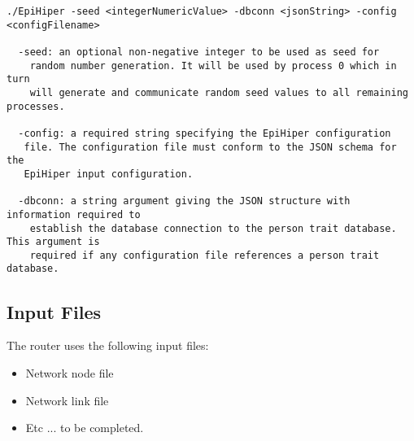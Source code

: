 \documentclass[english]{article}
\theoremstyle{remark}
\numberwithin{equation}{section}
\begin{document}
\begin{verbatim}
./EpiHiper -seed <integerNumericValue> -dbconn <jsonString> -config <configFilename>

  -seed: an optional non-negative integer to be used as seed for
    random number generation. It will be used by process 0 which in turn
    will generate and communicate random seed values to all remaining processes.

  -config: a required string specifying the EpiHiper configuration
   file. The configuration file must conform to the JSON schema for the
   EpiHiper input configuration.

  -dbconn: a string argument giving the JSON structure with information required to
    establish the database connection to the person trait database. This argument is
    required if any configuration file references a person trait database.
\end{verbatim}




\subsection{Input Files}
\label{sec:inputfiles}

The router uses the following input files:
\begin{itemize}
\item Network node file
\item Network link file
\item Etc ... to be completed.
\end{itemize}
\end{document}
